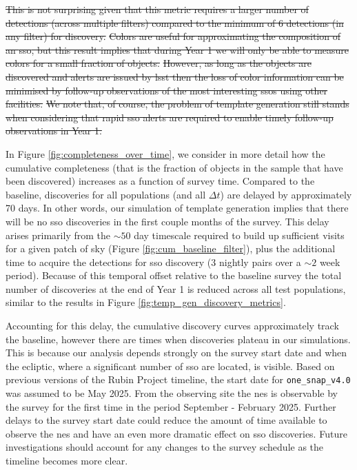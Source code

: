 \documentclass[preprintm,linenumbers]{aastex631}
\newcommand{\baseline}{\texttt{one\_snap\_v4.0}\xspace}
\begin{document}
\sout{This is not surprising given that this metric requires a larger number of detections (across multiple filters) compared to the minimum of 6 detections (in any filter) for discovery.}
  \sout{Colors are useful for approximating the composition of an \gls*{sso}, but this result implies that during Year 1 we will only be able to measure colors for a small fraction of objects.}
  \sout{However, as long as the objects are discovered and alerts are issued by \gls*{lsst} then the loss of color information can be minimised by follow-up observations of the most interesting \glspl*{sso} using other facilities.}
  \sout{We note that, of course, the problem of template generation still stands when considering that rapid \gls*{sso} alerts are required to enable timely follow-up observations in Year 1. }
		
		In Figure \ref{fig:completeness_over_time}, we consider in more detail how the cumulative completeness (that is the fraction of objects in the sample that have been discovered) increases as a function of survey time.
  Compared to the baseline, discoveries for all populations (and all $\Delta t$) are delayed by approximately 70 days.
  In other words, our simulation of template generation implies that there will be no \gls*{sso} discoveries in the first couple months of the survey.
  This delay arises primarily from the $\sim 50$ day timescale required to build up sufficient visits for a given patch of sky (Figure \ref{fig:cum_baseline_filter}), plus the additional time to acquire the detections for \gls*{sso} discovery (3 nightly pairs over a $\sim 2$ week period).
  Because of this temporal offset relative to the baseline survey the total number of discoveries at the end of Year 1 is reduced across all test populations, similar to the results in Figure \ref{fig:temp_gen_discovery_metrics}.
  
Accounting for this delay, the cumulative discovery curves approximately track the baseline, however there are times when discoveries plateau in our simulations.
This is because our analysis depends strongly on the survey start date and when the ecliptic, where a significant number of \gls*{sso} are located, is visible. 
Based on previous versions of the Rubin Project timeline, the start date for \baseline was assumed to be May 2025.
From the observing site the \gls*{nes} is observable by the survey for the first time in the period September - February 2025. 
Further delays to the survey start date could reduce the amount of time available to observe the \gls*{nes} and have an even more dramatic effect on \gls*{sso} discoveries.
Future investigations should account for any changes to the survey schedule as the timeline becomes more clear.
		
\end{document}
